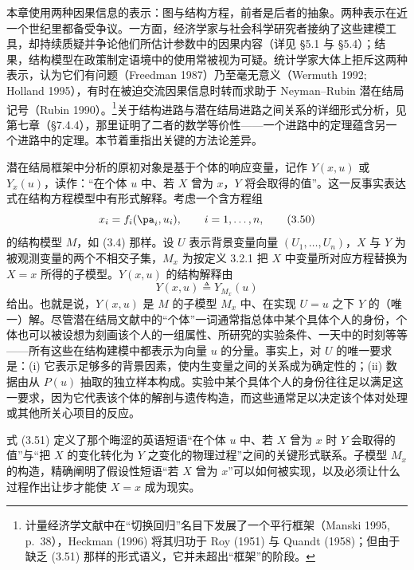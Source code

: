 本章使用两种因果信息的表示：图与结构方程，前者是后者的抽象。两种表示在近一个世纪里都备受争议。一方面，经济学家与社会科学研究者接纳了这些建模工具，却持续质疑并争论他们所估计参数中的因果内容（详见 \S 5.1 与 \S 5.4）；结果，结构模型在政策制定语境中的使用常被视为可疑。统计学家大体上拒斥这两种表示，认为它们有问题（Freedman 1987）乃至毫无意义（Wermuth 1992; Holland 1995），有时在被迫交流因果信息时转而求助于 Neyman–Rubin 潜在结局记号（Rubin 1990）。\footnote{计量经济学文献中在“切换回归”名目下发展了一个平行框架（Manski 1995, p.~38），Heckman (1996) 将其归功于 Roy (1951) 与 Quandt (1958)；但由于缺乏 \textup{(3.51)} 那样的形式语义，它并未超出“框架”的阶段。}关于结构进路与潜在结局进路之间关系的详细形式分析，见第七章（\S 7.4.4），那里证明了二者的数学等价性——一个进路中的定理蕴含另一个进路中的定理。本节着重指出关键的方法论差异。

潜在结局框架中分析的原初对象是基于个体的响应变量，记作 $Y(x,u)$ 或 $Y_x(u)$，读作：“在个体 $u$ 中、若 $X$ 曾为 $x$，$Y$ 将会取得的值”。这一反事实表达式在结构方程模型中有形式解释。考虑一个含方程组
\begin{equation}
x_i=f_i(\pa_i,u_i),\qquad i=1,\dots,n, \tag{3.50}
\end{equation}
的结构模型 $M$，如 \textup{(3.4)} 那样。设 $U$ 表示背景变量向量 $(U_1,\dots,U_n)$，$X$ 与 $Y$ 为被观测变量的两个不相交子集，$M_x$ 为按定义 3.2.1 把 $X$ 中变量所对应方程替换为 $X=x$ 所得的子模型。$Y(x,u)$ 的结构解释由
\begin{equation}
Y(x,u)\triangleq Y_{M_x}(u) \tag{3.51}
\end{equation}
给出。也就是说，$Y(x,u)$ 是 $M$ 的子模型 $M_x$ 中、在实现 $U=u$ 之下 $Y$ 的（唯一）解。尽管潜在结局文献中的“个体”一词通常指总体中某个具体个人的身份，个体也可以被设想为刻画该个人的一组属性、所研究的实验条件、一天中的时刻等等——所有这些在结构建模中都表示为向量 $u$ 的分量。事实上，对 $U$ 的唯一要求是：(i) 它表示足够多的背景因素，使内生变量之间的关系成为确定性的；(ii) 数据由从 $P(u)$ 抽取的独立样本构成。实验中某个具体个人的身份往往足以满足这一要求，因为它代表该个体的解剖与遗传构造，而这些通常足以决定该个体对处理或其他所关心项目的反应。

式 \textup{(3.51)} 定义了那个晦涩的英语短语“在个体 $u$ 中、若 $X$ 曾为 $x$ 时 $Y$ 会取得的值”与“把 $X$ 的变化转化为 $Y$ 之变化的物理过程”之间的关键形式联系。子模型 $M_x$ 的构造，精确阐明了假设性短语“若 $X$ 曾为 $x$”可以如何被实现，以及必须让什么过程作出让步才能使 $X=x$ 成为现实。

